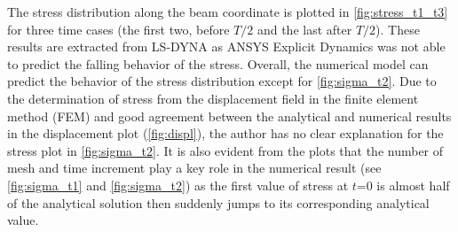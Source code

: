 \documentclass{article}
\begin{document}
The stress distribution along the beam coordinate is plotted in \cref{fig:stress_t1_t3} for three time cases (the first two, before $T/2$ and the last after $T/2$). These results are extracted from LS-DYNA as ANSYS Explicit Dynamics was not able to predict the falling behavior of the stress. Overall, the numerical model can predict the behavior of the stress distribution except for \cref{fig:sigma_t2}. Due to the determination of stress from the displacement field in the finite element method (FEM) and good agreement between the analytical and numerical results in the displacement plot (\cref{fig:displ}), the author has no clear explanation for the stress plot in \cref{fig:sigma_t2}. It is also evident from the plots that the number of mesh and time increment play a key role in the numerical result (see \cref{fig:sigma_t1} and \cref{fig:sigma_t2}) as the first value of stress at $t$=0 is almost half of the analytical solution then suddenly jumps to its corresponding analytical value. \\ 
\end{document}
